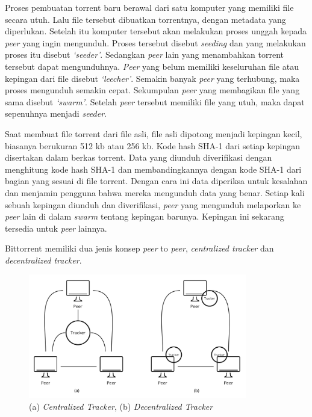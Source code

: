 Proses pembuatan torrent baru berawal dari satu komputer yang memiliki file secara utuh. Lalu file tersebut dibuatkan torrentnya, dengan metadata yang diperlukan. Setelah itu komputer tersebut akan melakukan proses unggah kepada \emph{peer} yang ingin mengunduh. Proses tersebut disebut \emph{seeding} dan yang melakukan proses itu disebut \emph{`seeder'}. Sedangkan \emph{peer} lain yang menambahkan torrent tersebut dapat mengunduhnya. \emph{Peer} yang belum memiliki keseluruhan file atau kepingan dari file disebut \emph{`leecher'}. Semakin banyak \emph{peer} yang terhubung, maka proses mengunduh semakin cepat. Sekumpulan \emph{peer} yang membagikan file yang sama disebut \emph{`swarm'}. Setelah \emph{peer} tersebut memiliki file yang utuh, maka dapat sepenuhnya menjadi \emph{seeder}.

Saat membuat file torrent dari file asli, file asli dipotong menjadi kepingan kecil, biasanya berukuran 512 kb atau 256 kb. Kode hash SHA-1 dari setiap kepingan disertakan dalam berkas torrent. Data yang diunduh diverifikasi dengan menghitung kode hash SHA-1 dan membandingkannya dengan kode SHA-1 dari bagian yang sesuai di file torrent. Dengan cara ini data diperiksa untuk kesalahan dan menjamin pengguna bahwa mereka mengunduh data yang benar. Setiap kali sebuah kepingan diunduh dan diverifikasi, \emph{peer} yang mengunduh melaporkan ke \emph{peer} lain di dalam \emph{swarm} tentang kepingan barunya. Kepingan ini sekarang tersedia untuk \emph{peer} lainnya. 

Bittorrent memiliki dua jenis konsep \emph{peer} to \emph{peer}, \emph{centralized tracker} dan \emph{decentralized tracker}. 

\begin{figure}[H]
  \centering{}
	\includegraphics[width=0.85\textwidth]{gambar/bittorrent_arsitektur}
  \caption{(a) \emph{Centralized Tracker}, (b) \emph{Decentralized Tracker}}
\end{figure}

